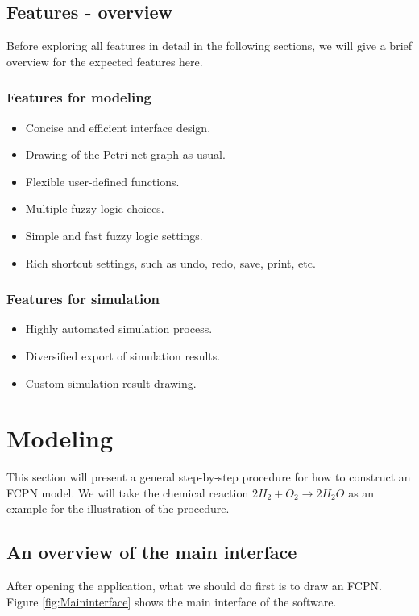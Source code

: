 \documentclass[journal,a4paper,onecolumn]{article}
\begin{document}
\subsection{Features - overview}
Before exploring all features in detail in the following sections, we will give a brief overview for the expected features here.

\subsubsection{Features for modeling}
\begin{itemize}
	\item Concise and efficient interface design.
	\item Drawing of the Petri net graph as usual.
	\item Flexible user-defined functions.
	\item Multiple fuzzy logic choices.
	\item Simple and fast fuzzy logic settings.
	\item Rich shortcut settings, such as undo, redo, save, print, etc.
\end{itemize}


\subsubsection{Features for simulation}
\begin{itemize}
	\item Highly automated simulation process.
	\item Diversified export of simulation results.
	\item Custom simulation result drawing.
\end{itemize}






\clearpage
\section{Modeling}

This section will present a general step-by-step procedure for how to construct an FCPN model. We will take the chemical reaction $2H_2+O_2\to 2H_2O$ as an example \cite{Mur89} for the illustration of the procedure.

\subsection{An overview of the main interface}
After opening the application, what we should do first is to draw an FCPN. Figure \ref{fig:Maininterface} shows the main interface of the software. 
\end{document}

